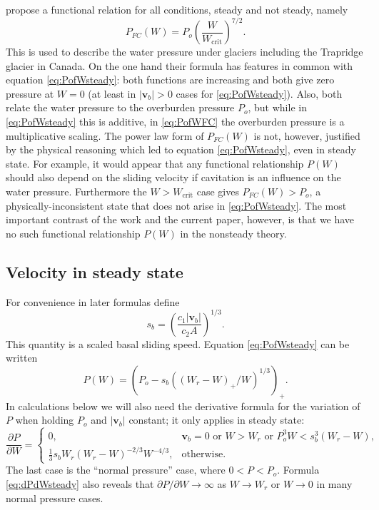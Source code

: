 \documentclass[11pt,final]{amsart}%
\newcommand\bv{\mathbf{v}}
\begin{document}
\cite{FlowersClarke2002_theory} propose a functional relation for all conditions, steady and not steady, namely
\begin{equation}
P_{FC}(W) = P_o \left(\frac{W}{W_{\text{crit}}}\right)^{7/2}. \label{eq:PofWFC}
\end{equation}
This is used to describe the water pressure under glaciers including the Trapridge glacier in Canada.  On the one hand their formula has features in common with equation \eqref{eq:PofWsteady}: both functions are increasing and both give zero pressure at $W=0$ (at least in $|\bv_b|>0$ cases for \eqref{eq:PofWsteady}).  Also, both relate the water pressure to the overburden pressure $P_o$, but while in \eqref{eq:PofWsteady} this is additive, in \eqref{eq:PofWFC} the overburden pressure is a multiplicative scaling.  The power law form of $P_{FC}(W)$ is not, however, justified by the physical reasoning which led to equation \eqref{eq:PofWsteady}, even in steady state.  For example, it would appear that any functional relationship $P(W)$ should also depend on the sliding velocity if cavitation is an influence on the water pressure.  Furthermore the $W>W_{\text{crit}}$ case gives $P_{FC}(W) > P_o$, a physically-inconsistent state that does not arise in \eqref{eq:PofWsteady}.  The most important contrast of the \cite{FlowersClarke2002_theory} work and the current paper, however, is that we have no such functional relationship $P(W)$ in the nonsteady theory.

\subsection*{Velocity in steady state}  For convenience in later formulas define
    $$s_b =  \left(\frac{c_1 |\bv_b|}{c_2 A}\right)^{1/3}.$$
This quantity is a scaled basal sliding speed.  Equation \eqref{eq:PofWsteady} can be written
\begin{equation}
P(W) = \left(P_o - s_b \left((W_r - W)_+/W\right)^{1/3}\right)_+.  \label{eq:againPofWsteady}
\end{equation}
In calculations below we will also need the derivative formula for the variation of $P$ when holding $P_o$ and $|\bv_b|$ constant; it only applies in steady state:
\begin{equation}
\frac{\partial P}{\partial W} =
    \begin{cases}
      0, & \bv_b = 0 \text{ or } W > W_r \text{ or } P_o^3 W < s_b^3 (W_r - W), \\
      \frac{1}{3} s_b W_r (W_r - W)^{-2/3} W^{-4/3}, & \text{otherwise}.
    \end{cases}  \label{eq:dPdWsteady}
\end{equation}
The last case is the ``normal pressure'' case, where $0 < P < P_o$.  Formula \eqref{eq:dPdWsteady} also reveals that $\partial P / \partial W \to \infty$ as $W \to W_r$ or $W\to 0$ in many normal pressure cases.
\end{document}
